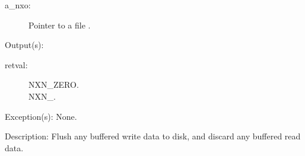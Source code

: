 \begin{capi}
\begin{capilist}
\begin{description}
		\item[a\_nxo: ]
			Pointer to a file .
		\end{description}
	\item[Output(s): ]
		\begin{description}\item[]
		\item[retval: ]
			\begin{description}\item[]
			\item[NXN\_ZERO.]
			\item[NXN\_.]
			\end{description}
		\end{description}
	\item[Exception(s): ] None.
	\item[Description: ]
		Flush any buffered write data to disk, and discard any buffered
		read data.
	\end{capilist}
\end{capi}
